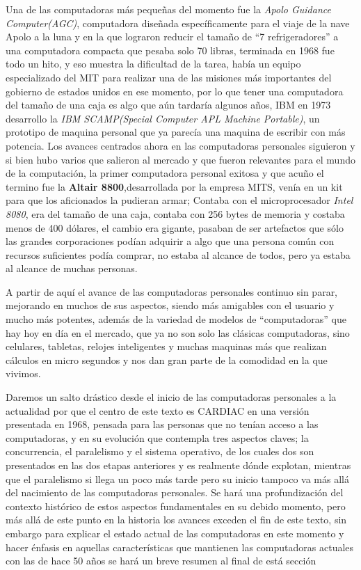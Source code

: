 \documentclass[letterpaper,12pt,oneside]{book}
\begin{document}
		Una de las computadoras más pequeñas del momento fue la \textit{Apolo Guidance Computer(AGC)}, computadora diseñada específicamente para el viaje
		de la nave Apolo a la luna y en la que lograron reducir el tamaño de ``7 refrigeradores'' a una computadora compacta que pesaba solo 70 libras,
		terminada en 1968 fue todo un hito, y eso muestra la dificultad de la tarea, había un equipo especializado del MIT para realizar una de las
		misiones más importantes del gobierno de estados unidos en ese momento, por lo que tener una computadora del tamaño de una caja es algo
		que aún tardaría algunos años, IBM en 1973 desarrollo la \textit{IBM SCAMP(Special Computer APL Machine Portable)}, un prototipo de maquina
		personal que ya parecía una maquina de escribir con más potencia. Los avances centrados ahora en las computadoras personales siguieron y si bien
		hubo varios que salieron al mercado y que fueron relevantes para el mundo de la computación, la primer computadora personal exitosa y que
		acuño el termino fue la \textbf{Altair 8800},desarrollada por la empresa MITS, venía en un kit para que los aficionados la pudieran armar; Contaba
		con el microprocesador \textit{Intel 8080}, era del tamaño de una caja, contaba con 256 bytes de memoria y costaba menos de 400 dólares, el cambio
		era gigante, pasaban de ser artefactos que sólo las grandes corporaciones podían adquirir a algo que una persona común con recursos suficientes
		podía comprar, no estaba al alcance de todos, pero ya estaba al alcance de muchas personas.
		
		A partir de aquí el avance de las computadoras personales continuo sin parar, mejorando en muchos de sus aspectos, siendo más amigables
		con el usuario y mucho más potentes, además de la variedad de modelos de ``computadoras'' que hay hoy en día en el mercado, que ya no
		son solo las clásicas computadoras, sino celulares, tabletas, relojes inteligentes y muchas maquinas más que realizan cálculos en micro segundos
		y nos dan gran parte de la comodidad en la que vivimos.
					

		Daremos un salto drástico desde el inicio de las computadoras personales a la actualidad por que el centro de este texto es CARDIAC en una versión
		presentada en 1968, pensada para las personas que no tenían acceso a las computadoras, y en su evolución que contempla tres aspectos claves;
		la concurrencia, el paralelismo y el sistema operativo, de los cuales dos son presentados en las dos etapas anteriores y es realmente dónde explotan, mientras
		que el paralelismo si llega un poco más tarde pero su inicio tampoco va más allá del nacimiento de las computadoras personales. Se hará una profundización del
		contexto histórico de estos aspectos fundamentales en su debido momento, pero más allá de este punto en la historia los avances exceden el fin de este
		texto, sin embargo para explicar el estado actual de las computadoras en este momento y hacer énfasis en aquellas características que mantienen
		las computadoras actuales con las de hace 50 años se hará un breve resumen al final de está sección
\end{document}
